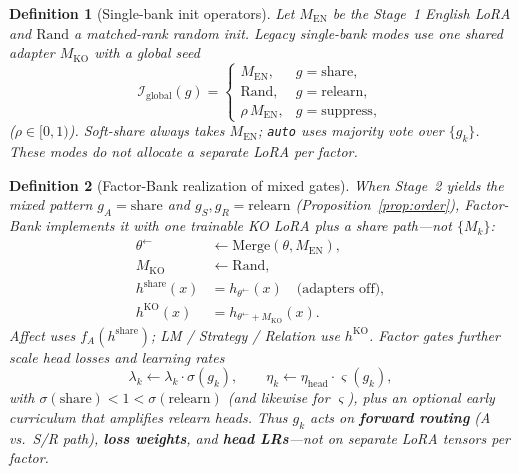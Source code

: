 \documentclass[journal]{IEEEtran}
\newtheorem{definition}{Definition}
\begin{document}
\begin{definition}[Single-bank init operators]
\label{def:init}
Let $M_{\mathrm{EN}}$ be the Stage~1 English LoRA and $\mathrm{Rand}$ a matched-rank random init.
Legacy single-bank modes use one shared adapter $M_{\mathrm{KO}}$ with a global seed
\begin{equation}
\label{eq:init}
\mathcal{I}_{\mathrm{global}}(g)
=
\begin{cases}
M_{\mathrm{EN}}, & g=\mathrm{share},\\
\mathrm{Rand}, & g=\mathrm{relearn},\\
\rho\,M_{\mathrm{EN}}, & g=\mathrm{suppress},
\end{cases}
\end{equation}
($\rho\in[0,1)$). Soft-share always takes $M_{\mathrm{EN}}$; \texttt{auto} uses majority vote over $\{g_k\}$.
These modes do \emph{not} allocate a separate LoRA per factor.
\end{definition}

\begin{definition}[Factor-Bank realization of mixed gates]
\label{def:bank}
When Stage~2 yields the mixed pattern $g_A{=}\mathrm{share}$ and $g_S,g_R{=}\mathrm{relearn}$ (Proposition~\ref{prop:order}), Factor-Bank implements it with \emph{one} trainable KO LoRA plus a share path---not $\{M_k\}$:
\begin{align}
\label{eq:bank}
\theta^{\leftarrow} &\leftarrow \mathrm{Merge}(\theta, M_{\mathrm{EN}}),\\
M_{\mathrm{KO}} &\leftarrow \mathrm{Rand},\\
h^{\mathrm{share}}(x) &= h_{\theta^{\leftarrow}}(x)\quad\text{(adapters off)},\\
h^{\mathrm{KO}}(x) &= h_{\theta^{\leftarrow}+M_{\mathrm{KO}}}(x).
\end{align}
Affect uses $f_A(h^{\mathrm{share}})$; LM / Strategy / Relation use $h^{\mathrm{KO}}$.
Factor gates further scale head losses and learning rates
\begin{equation}
\label{eq:gate_scale}
\lambda_k \leftarrow \lambda_k\cdot \sigma(g_k),\qquad
\eta_k \leftarrow \eta_{\mathrm{head}}\cdot \varsigma(g_k),
\end{equation}
with $\sigma(\mathrm{share}){<}1{<}\sigma(\mathrm{relearn})$ (and likewise for $\varsigma$), plus an optional early curriculum that amplifies relearn heads.
Thus $g_k$ acts on \textbf{forward routing} (A vs.\ S/R path), \textbf{loss weights}, and \textbf{head LRs}---not on separate LoRA tensors per factor.
\end{definition}
\end{document}
